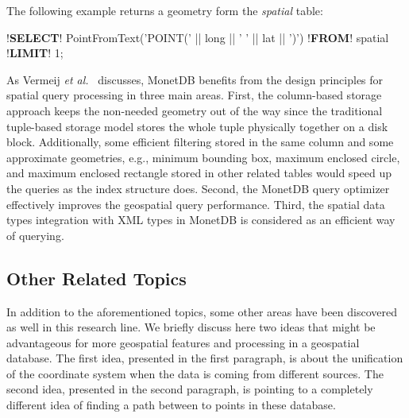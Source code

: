 \documentclass[a4paper,12pt]{article}
\begin{document}
The following example returns a geometry form the \textit{spatial} table:
\vspace{10px}
\begin{fakeJSON}[escapechar=\!]
!\textbf{SELECT}! PointFromText('POINT(' || long || ' ' || lat || ')') !\textbf{FROM}! spatial !\textbf{LIMIT}! 1;
\end{fakeJSON}
\vspace{10px}

As Vermeij \emph{et al.}~\cite{MonetDB} discusses, MonetDB benefits from the design principles for spatial query processing in three main areas. First, the column-based storage approach keeps the non-needed geometry out of the way since the traditional tuple-based storage model stores the whole tuple physically together on a disk block. Additionally, some efficient filtering stored in the same column and some approximate geometries, e.g., minimum bounding box, maximum enclosed circle, and maximum enclosed rectangle stored in other related tables would speed up the queries as the index structure does. Second, the MonetDB query optimizer effectively improves the geospatial query performance. Third, the spatial data types integration with XML types in MonetDB is considered as an efficient way of querying. 


\subsection{Other Related Topics}

In addition to the aforementioned topics, some other areas have been discovered as well in this research line. 
We briefly discuss here two ideas that might be advantageous 
for more geospatial features and processing in a geospatial database.
The first idea, presented in the first paragraph, is about the unification of the coordinate system when the data
is coming from different sources. The second idea, presented in the second paragraph, is pointing to a 
completely different idea of finding a path between to points in these database.
\end{document}

